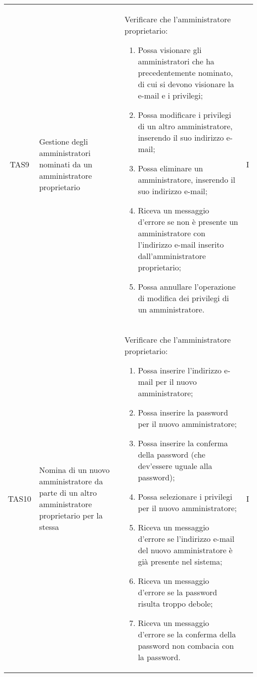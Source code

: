 {\begin{longtable}{ c  C{2.5cm}  C{10cm} C{1cm}}
TAS9 & Gestione degli amministratori nominati da un amministratore proprietario & 
Verificare che l'amministratore proprietario:
\begin{enumerate}
    \item Possa visionare gli amministratori che ha precedentemente nominato, di cui si devono visionare la e-mail e i privilegi;
    \item Possa modificare i privilegi di un altro amministratore, inserendo il suo indirizzo e-mail;
    \item Possa eliminare un amministratore, inserendo il suo indirizzo e-mail; 
    \item Riceva un messaggio d'errore se non è presente un amministratore con l'indirizzo e-mail inserito dall'amministratore proprietario;
    \item Possa annullare l'operazione di modifica dei privilegi di un amministratore.
\end{enumerate} & I \\

TAS10 & Nomina di un nuovo amministratore da parte di un altro amministratore proprietario per la stessa  & 
Verificare che l'amministratore proprietario:
\begin{enumerate}
    \item Possa inserire l'indirizzo e-mail per il nuovo amministratore;
    \item Possa inserire la password per il nuovo amministratore;
    \item Possa inserire la conferma della password (che dev'essere uguale alla password);
    \item Possa selezionare i privilegi per il nuovo amministratore;
    \item Riceva un messaggio d'errore se l'indirizzo e-mail del nuovo amministratore è già presente nel sistema;
    \item Riceva un messaggio d'errore se la password risulta troppo debole;
    \item Riceva un messaggio d'errore se la conferma della password non combacia con la password.
\end{enumerate} & I \\
\end{longtable}
}